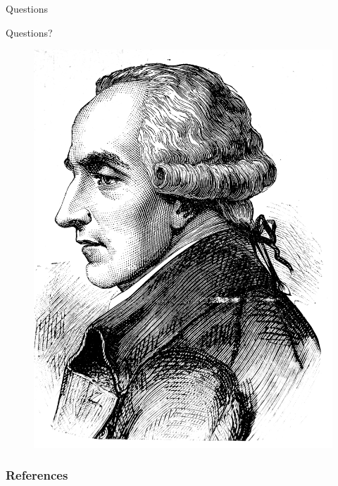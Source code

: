 \documentclass{beamer}
\begin{document}
\begin{frame}{Questions}
  \begin{minipage}{\dimexpr.4\textwidth+4em}
    \centering
    \Huge{Questions?}
  \end{minipage}
  \begin{minipage}{.4\textwidth}
    \begin{figure}[ht]
      \centering
      \includegraphics[width=1.0\textwidth, height=1.0\textheight, keepaspectratio]{img/laplace_profile}
    \end{figure}
  \end{minipage}
\end{frame}
\begin{frame}[allowframebreaks]
        \frametitle{References}
        
        
\end{frame}
\end{document}
